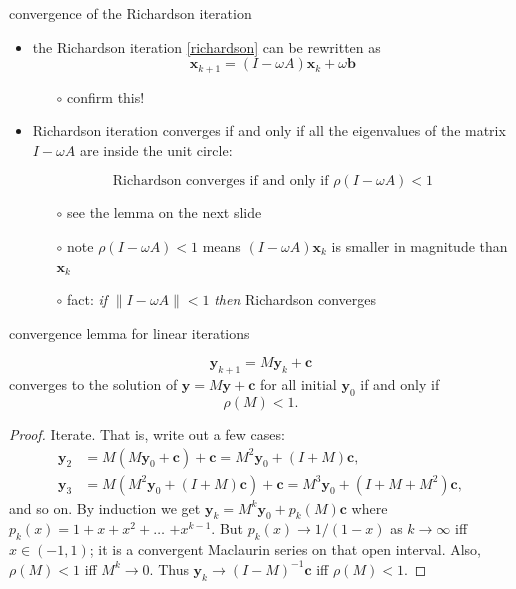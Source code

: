 \documentclass[10pt,hyperref]{beamer}
\newcommand{\bb}{\mathbf{b}}
\newcommand{\bc}{\mathbf{c}}
\newcommand{\bx}{\mathbf{x}}
\newcommand{\by}{\mathbf{y}}
\begin{document}
\begin{frame}{convergence of the Richardson iteration}

\begin{itemize}
\item the Richardson iteration \eqref{richardson} can be rewritten as
    $$\bx_{k+1} = (I - \omega A) \bx_k + \omega \bb$$

\vspace{-2mm}
  \begin{itemize}
  \item[$\circ$] confirm this!
  \end{itemize}
\item Richardson iteration converges if and only if all the eigenvalues of the matrix $I-\omega A$ are inside the unit circle:

$$\text{Richardson converges if and only if } \rho(I-\omega A) < 1$$

  \begin{itemize}
  \item[$\circ$] see the lemma on the next slide
  \item[$\circ$] note $\rho(I-\omega A) < 1$ means $(I - \omega A) \bx_k$ is smaller in magnitude than $\bx_k$
  \item[$\circ$] fact: \emph{if} $\|I-\omega A\| < 1$ \emph{then} Richardson converges
  \end{itemize}
\end{itemize}
\end{frame}


\begin{frame}{convergence lemma for linear iterations}

\begin{lemma}
   $$\by_{k+1} = M \by_k + \bc$$
converges to the solution of $\by = M \by + \bc$ for all initial $\by_0$ if and only if
   $$\rho(M) < 1.$$
\end{lemma}

\small
\begin{proof}
Iterate.  That is, write out a few cases:
\begin{align*}
   \by_2 &= M (M \by_0 + \bc) + \bc = M^2 \by_0 + (I + M) \bc, \\
   \by_3 &= M (M^2 \by_0 + (I + M) \bc) + \bc = M^3 \by_0 + (I + M + M^2) \bc,
\end{align*}
and so on.  By induction we get $\by_k = M^k \by_0 + p_k(M) \bc$ where $p_k(x) = 1 + x + x^2 + \dots$ $+ x^{k-1}$.  But $p_k(x) \to 1/(1-x)$ as $k\to\infty$ iff $x\in(-1,1)$; it is a convergent Maclaurin series on that open interval.  Also, $\rho(M)<1$ iff $M^k \to 0$.  Thus $\by_k \to (I-M)^{-1} \bc$ iff $\rho(M) < 1$.
\end{proof}
\end{frame}
\end{document}
